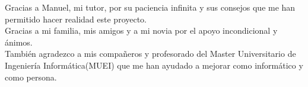 \documentclass[11pt,a4paper,titlepage,oneside]{report}
\begin{document}

  
 \paxinaenbranco
 \begin{agradecementos}

Gracias a Manuel, mi tutor, por su paciencia infinita y sus consejos que me han permitido hacer realidad este proyecto.\\ 

Gracias a mi familia, mis amigos y a mi novia por el apoyo incondicional y ánimos. \\

También agradezco a mis compañeros y profesorado del Master Universitario de Ingeniería Informática(MUEI) que me han ayudado a mejorar como
informático y como persona.\\

 \end{agradecementos}
 

 \setcounter{page}{1}

 \tableofcontents
 \listoffigures
 \listoftables
 \clearpage
 
 \setcounter{page}{1}


 
 
 
 
 
 
 
 
 
 
 


 \appendix
 \appendixpage
 
%

 \printglossary[type=\acronymtype,title=\nomeglosarioacronimos]
 \printglossary[title=\nomeglosariotermos]

 
 
 \clearpage
 
\end{document}
